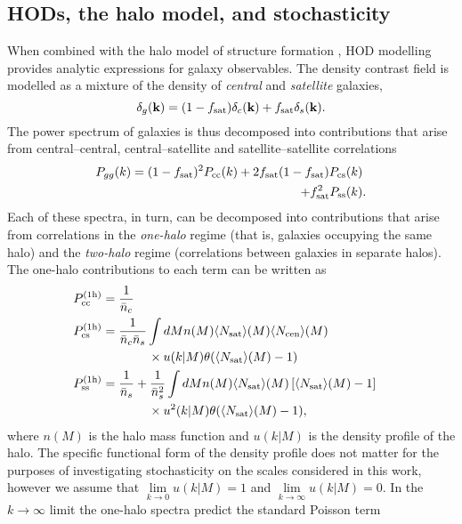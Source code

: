 \documentclass[fleqn,usenatbib]{mnras}
\newcommand{\bk}{\textbf{k}}
\begin{document}
\subsection{HODs, the halo model, and stochasticity}
\label{subsection:analyticnonpoiss}
When combined with the halo model of structure formation \citep{COORAY_2002}, HOD modelling provides analytic expressions for galaxy observables. The density contrast field is modelled as a mixture of the density of \emph{central} and \emph{satellite} galaxies, 
\begin{equation}
    \delta_g (\bk) = (1-f_{\rm sat}) \delta_c (\bk) + f_{\rm sat} \delta_s (\bk).
\end{equation}
The power spectrum of galaxies is thus decomposed into contributions that arise from central--central, central--satellite and satellite--satellite correlations 
\begin{align}
    P_{gg} (k) = (1 - f_{\rm sat})^2 P_{\rm cc} (k) + 2 f_{\rm sat}(1 - f_{\rm sat}) P_{\rm cs} (k)&\\ 
    \nonumber + f_{\rm sat}^2 P_{\rm ss}(k)&.
\end{align}
Each of these spectra, in turn, can be decomposed into contributions that arise from correlations in the \emph{one-halo} regime (that is, galaxies occupying the same halo) and the \emph{two-halo} regime (correlations between galaxies in separate halos). The one-halo contributions to each term can be written as
\begin{align}
    \label{eqn:pcc} &P_{\rm cc}^{{\rm (1h)}} = \frac{1}{\bar{n}_c} {}&\\
    \label{eqn:pcs} &P_{\rm cs}^{{\rm (1h)}} = \frac{1}{\bar{n}_c \bar{n}_s} \int dM n(M) \langle N_{\rm sat} \rangle (M) \langle N_{\rm cen} \rangle (M) \\
    \nonumber{}& \quad\quad\quad\quad\quad\quad \times  u (k | M) \theta(\langle N_{\rm sat} \rangle (M) - 1) \\
    \label{eqn:pss} &P_{\rm ss}^{{\rm (1h)}} = \frac{1}{\bar{n}_s} + \frac{1}{\bar{n}_s^2} \int dM n(M) \langle N_{\rm sat} \rangle (M) \left [ \langle N_{\rm sat} \rangle (M) - 1 \right ] \\
    \nonumber{}& \quad\quad\quad\quad\quad\quad  \times u^2 (k | M) \theta(\langle N_{\rm sat} \rangle (M) - 1),
\end{align}
where $n(M)$ is the halo mass function and $u(k|M)$ is the density profile of the halo. The specific functional form of the density profile does not matter for the purposes of investigating stochasticity on the scales considered in this work, however we assume that $\lim\limits_{k\to 0} u(k|M) = 1$ and $\lim\limits_{k\to \infty} u(k|M) = 0$. In the $k \to \infty$ limit the one-halo spectra predict the standard Poisson term
\end{document}
